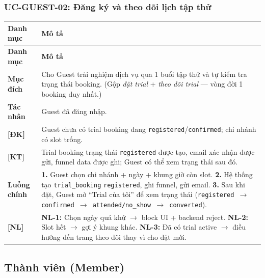 \subsubsection{UC-GUEST-02: Đăng ký và theo dõi lịch tập thử}
\begingroup
\renewcommand{\arraystretch}{1.3}
\begin{longtable}{|>{\centering\arraybackslash}m{3cm}|>{\raggedright\arraybackslash}m{12cm}|}
\hline
\textbf{Danh mục} & \textbf{Mô tả} \\ \hline
\endfirsthead
\hline
\textbf{Danh mục} & \textbf{Mô tả} \\ \hline
\endhead
\hline
\endfoot
\textbf{Mục đích} & Cho Guest trải nghiệm dịch vụ qua 1 buổi tập thử và tự kiểm tra trạng thái booking. (Gộp \emph{đặt trial} + \emph{theo dõi trial} — vòng đời 1 booking duy nhất.) \\
\hline
\textbf{Tác nhân} & Guest đã đăng nhập. \\
\hline
\textbf{[ĐK]} & Guest chưa có trial booking đang \texttt{registered}/\texttt{confirmed}; chi nhánh có slot trống. \\
\hline
\textbf{[KT]} & Trial booking trạng thái \texttt{registered} được tạo, email xác nhận được gửi, funnel data được ghi; Guest có thể xem trạng thái sau đó. \\
\hline
\textbf{Luồng chính} & \textbf{1.} Guest chọn chi nhánh + ngày + khung giờ còn slot. \textbf{2.} Hệ thống tạo \texttt{trial\_booking} \texttt{registered}, ghi funnel, gửi email. \textbf{3.} Sau khi đặt, Guest mở ``Trial của tôi'' để xem trạng thái (\texttt{registered $\rightarrow$ confirmed $\rightarrow$ attended/no\_show $\rightarrow$ converted}). \\
\hline
\textbf{[NL]} & \textbf{NL-1:} Chọn ngày quá khứ $\rightarrow$ block UI + backend reject. \textbf{NL-2:} Slot hết $\rightarrow$ gợi ý khung khác. \textbf{NL-3:} Đã có trial active $\rightarrow$ điều hướng đến trang theo dõi thay vì cho đặt mới. \\
\hline
\end{longtable}
\endgroup

\subsection{Thành viên (Member)}

